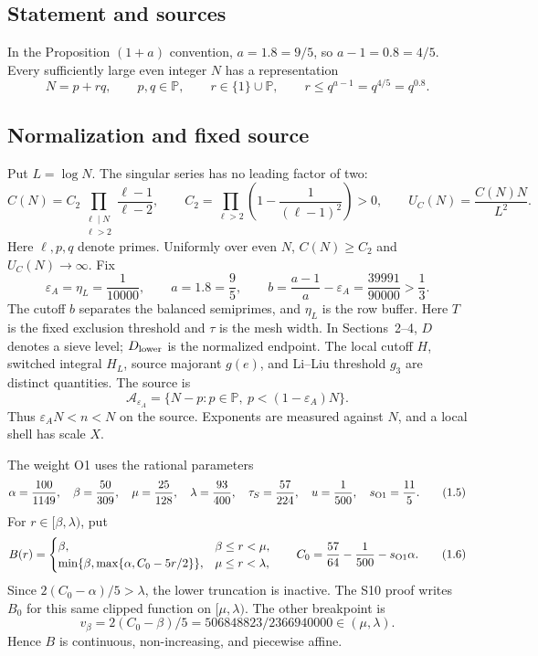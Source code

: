 \subsection{Statement and sources}

\begin{theorem}\label{thm:goldbach}
In the Proposition $(1+a)$ convention, $a=1.8=9/5$, so $a-1=0.8=4/5$.
Every sufficiently large even integer $N$ has a representation
\[
 N=p+rq,\qquad p,q\in\mathbb P,\qquad r\in\{1\}\cup\mathbb P,
 \qquad r\le q^{a-1}=q^{4/5}=q^{0.8}.                    \tag{1.1}
\]
\end{theorem}

\subsection{Normalization and fixed source}

Put $L=\log N$. The singular series has no leading factor of two:
\[
 C(N)=C_2\prod_{\substack{\ell\mid N\\\ell>2}}
          \frac{\ell-1}{\ell-2},\qquad
 C_2=\prod_{\ell>2}\left(1-\frac1{(\ell-1)^2}\right)>0,
 \qquad U_C(N)=\frac{C(N)N}{L^2}.                            \tag{1.2}
\]
Here $\ell,p,q$ denote primes.
Uniformly over even $N$, $C(N)\ge C_2$ and $U_C(N)\to\infty$.
Fix
\[
 \varepsilon_A=\eta_L=\frac1{10000},\qquad a=1.8=\frac95,
 \qquad b=\frac{a-1}{a}-\varepsilon_A
          =\frac{39991}{90000}>\frac13.                    \tag{1.3}
\]
The cutoff $b$ separates the balanced semiprimes, and $\eta_L$ is the row buffer.
Here $T$ is the fixed exclusion threshold and $\tau$ is the mesh width.
In Sections~2--4, $D$ denotes a sieve level; $D_{\rm lower}$ is the
normalized endpoint. The local cutoff $H$, switched integral $H_L$,
source majorant $g(e)$, and Li--Liu threshold $g_3$ are distinct quantities.
The source is
\[
 \mathcal A_{\varepsilon_A}
   =\{N-p:p\in\mathbb P,\ p<(1-\varepsilon_A)N\}.
                                                               \tag{1.4}
\]
Thus $\varepsilon_A N<n<N$ on the source.
Exponents are measured against $N$, and a local shell has scale $X$.

The weight O1 uses the rational parameters
\[
 \alpha=\frac{100}{1149},\quad \beta=\frac{50}{309},\quad
 \mu=\frac{25}{128},\quad\lambda=\frac{93}{400},\quad
 \tau_S=\frac{57}{224},\quad u=\frac1{500},\quad s_{\rm O1}=\frac{11}{5}.
                                                               \tag{1.5}
\]
For $r\in[\beta,\lambda)$, put
\[
 B(r)=\begin{cases}
 \beta,&\beta\le r<\mu,\\
 \min\{\beta,\max\{\alpha,C_0-5r/2\}\},&\mu\le r<\lambda,
 \end{cases}
 \qquad C_0=\frac{57}{64}-\frac1{500}-s_{\rm O1}\alpha.
                                                               \tag{1.6}
\]
Since $2(C_0-\alpha)/5>\lambda$, the lower truncation is inactive.
The S10 proof writes $B_0$ for this same clipped function on $[\mu,\lambda)$.
The other breakpoint is
\[
 v_\beta=2(C_0-\beta)/5=506848823/2366940000\in(\mu,\lambda).
\]
Hence $B$ is continuous, non-increasing, and piecewise affine.

